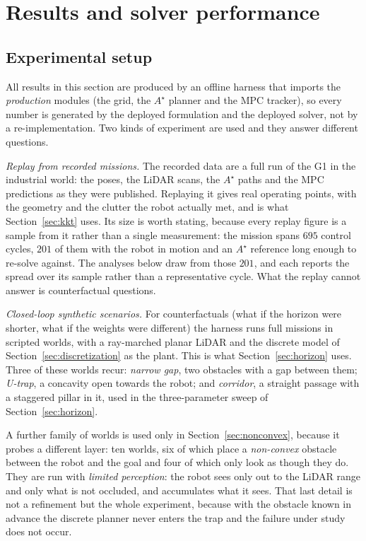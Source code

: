 \documentclass[11pt,a4paper]{article}
\newcommand{\astar}{$A^\star$}
\begin{document}
\section{Results and solver performance}
\label{sec:performance}

\subsection{Experimental setup}
\label{sec:setup}

All results in this section are produced by an offline harness that imports the \emph{production} modules
(the grid, the \astar{} planner and the MPC tracker), so every number is generated by the deployed
formulation and the deployed solver, not by a re-implementation. Two kinds of experiment are used and they
answer different questions.

\emph{Replay from recorded missions.} The recorded data are a full run of the G1 in the industrial world:
the poses, the LiDAR scans, the \astar{} paths and the MPC predictions as they were published. Replaying it
gives real operating points, with the geometry and the clutter the robot actually met, and is what
Section~\ref{sec:kkt} uses. Its size is worth stating, because every replay figure is a
sample from it rather than a single measurement: the mission spans $695$ control cycles, $201$ of them with
the robot in motion and an \astar{} reference long enough to re-solve against. The analyses below draw
from those $201$, and each reports the spread over its sample rather than a representative cycle. What the
replay cannot answer is counterfactual questions.

\emph{Closed-loop synthetic scenarios.} For counterfactuals (what if the horizon were shorter, what if the
weights were different) the harness runs full missions in scripted worlds, with a ray-marched planar
LiDAR and the discrete model of Section~\ref{sec:discretization} as the plant. This is what
Section~\ref{sec:horizon} uses. Three of these worlds recur: \emph{narrow gap}, two obstacles with a gap
between them; \emph{U-trap}, a concavity open towards the robot; and \emph{corridor}, a straight passage with
a staggered pillar in it, used in the three-parameter sweep of Section~\ref{sec:horizon}.

A further family of worlds is used only in Section~\ref{sec:nonconvex}, because it probes a different layer: ten worlds,
six of which place a \emph{non-convex} obstacle between the robot and the goal and four of which only look as
though they do. They are run with \emph{limited perception}: the robot sees only out to the LiDAR range and
only what is not occluded, and accumulates what it sees. That last detail is not a refinement but the whole
experiment, because with the obstacle known in advance the discrete planner never enters the trap and the
failure under study does not occur.
\end{document}
